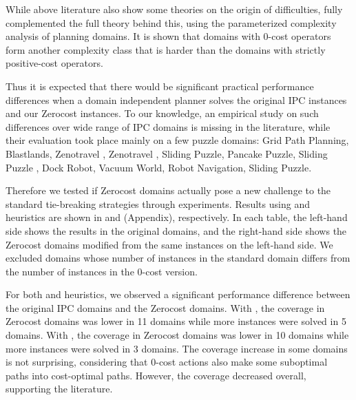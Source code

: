 While above literature also show some theories on the origin of difficulties, \citeauthor{aghighi2015} \citeyear{aghighi2015,aghighi2016} fully complemented the full theory behind this, using the parameterized complexity analysis of planning domains. It is shown %
that domains with 0-cost operators form another complexity class that is harder than the domains with strictly positive-cost operators.

Thus it is expected that there would be significant practical performance differences when a domain independent planner solves the original IPC instances and our Zerocost instances.
To our knowledge, an empirical study on such differences over wide range of IPC domains is missing in the literature, while their evaluation took place mainly on a few puzzle domains: Grid Path Planning, Blastlands, Zenotravel \cite{thayer2009using}, Zenotravel \cite{cushing2010cost}, Sliding Puzzle, Pancake Puzzle, Sliding Puzzle \cite{wilt2011cost}, Dock Robot, Vacuum World, Robot Navigation, Sliding Puzzle\cite{thayer2011bounded}.

Therefore we tested if Zerocost domains actually pose a new challenge to the
standard tie-breaking strategies through experiments. Results using \lmcut and \mands
heuristics are shown in  and
 (Appendix), respectively. In each table,
the left-hand side shows the results in the original domains, and the right-hand side
shows the Zerocost domains modified from the same
instances on the left-hand side. We excluded domains whose
number of instances in the standard domain differs from the number of instances in the 0-cost version.

For both \lmcut and \mands heuristics, we observed a significant
performance difference between the original IPC domains and the Zerocost
domains. With \lmcut, the coverage in Zerocost domains
was lower in 11 domains while more instances were solved
in 5 domains. With \mands, the coverage in Zerocost domains was lower in 10 domains while
more instances were solved in 3 domains.
The coverage increase in some domains is not surprising, considering that 0-cost actions also make some suboptimal paths into cost-optimal paths. However, the coverage decreased overall, supporting the literature.

